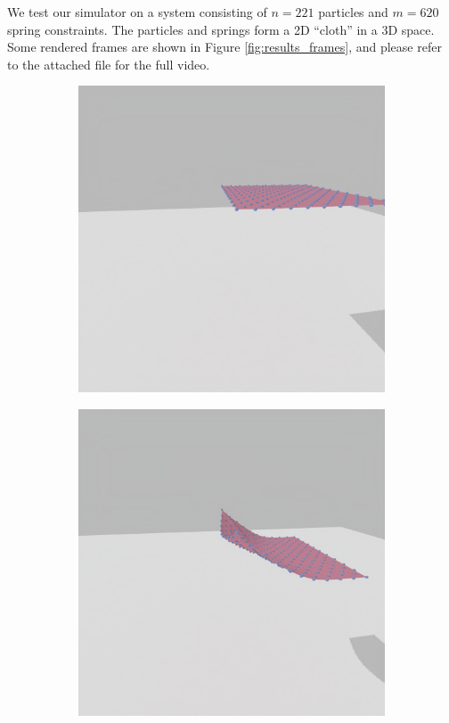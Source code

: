 \documentclass[conference]{IEEEtran}
\begin{document}
We test our simulator on a system consisting of $n=221$ particles and $m=620$ spring constraints. The particles and springs form a 2D ``cloth'' in a 3D space. Some rendered frames are shown in Figure \ref{fig:results_frames}, and please refer to the attached file for the full video. 

\begin{figure}[htbp]
    \centering
    \begin{subfigure}[b]{0.15\textwidth}
        \centering
        \includegraphics[width=\textwidth]{images/hw0/step_0000.png}
    \end{subfigure}
    \hfill %
    \begin{subfigure}[b]{0.15\textwidth}
        \centering
        \includegraphics[width=\textwidth]{images/hw0/step_0012.png}

\end{subfigure}
\end{figure}
\end{document}
